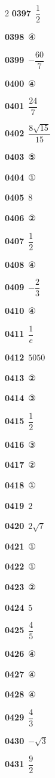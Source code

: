 \documentclass[10pt,a4paper]{article}
\begin{document}
\begin{multicols}{2}
\noindent\textbf{0397}\ $\dfrac{1}{2}$\par
\noindent\textbf{0398}\ ④\par
\noindent\textbf{0399}\ $-\dfrac{60}{7}$\par
\noindent\textbf{0400}\ ④\par
\noindent\textbf{0401}\ $\dfrac{24}{7}$\par
\noindent\textbf{0402}\ $\dfrac{8\sqrt{15}}{15}$\par
\noindent\textbf{0403}\ ⑤\par
\noindent\textbf{0404}\ ①\par
\noindent\textbf{0405}\ $8$\par
\noindent\textbf{0406}\ ②\par
\noindent\textbf{0407}\ $\dfrac{1}{2}$\par
\noindent\textbf{0408}\ ④\par
\noindent\textbf{0409}\ $-\dfrac{2}{3}$\par
\noindent\textbf{0410}\ ④\par
\noindent\textbf{0411}\ $\dfrac{1}{e}$\par
\noindent\textbf{0412}\ $5050$\par
\noindent\textbf{0413}\ ②\par
\noindent\textbf{0414}\ ③\par
\noindent\textbf{0415}\ $\dfrac{1}{2}$\par
\noindent\textbf{0416}\ ③\par
\noindent\textbf{0417}\ ②\par
\noindent\textbf{0418}\ ①\par
\noindent\textbf{0419}\ $2$\par
\noindent\textbf{0420}\ $2\sqrt{7}$\par
\noindent\textbf{0421}\ ①\par
\noindent\textbf{0422}\ ①\par
\noindent\textbf{0423}\ ②\par
\noindent\textbf{0424}\ $5$\par
\noindent\textbf{0425}\ $\dfrac{4}{5}$\par
\noindent\textbf{0426}\ ④\par
\noindent\textbf{0427}\ ④\par
\noindent\textbf{0428}\ ④\par
\noindent\textbf{0429}\ $\dfrac{4}{3}$\par
\noindent\textbf{0430}\ $-\sqrt{3}$\par
\noindent\textbf{0431}\ $\dfrac{9}{2}$\par

\end{multicols}
\end{document}
